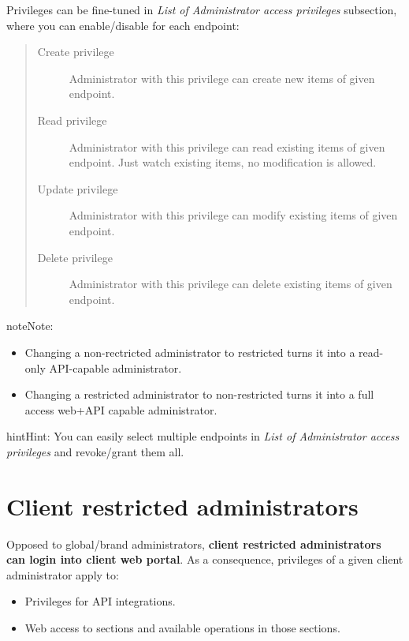\documentclass[letterpaper,10pt,english]{sphinxmanual}
\begin{document}
Privileges can be fine-tuned in \emph{List of Administrator access privileges} subsection, where you can enable/disable
for each endpoint:
\begin{quote}
\begin{description}
\item[{Create privilege}] \leavevmode
Administrator with this privilege can create new items of given endpoint.

\item[{Read privilege}] \leavevmode
Administrator with this privilege can read existing items of given endpoint. Just watch existing items, no
modification is allowed.

\item[{Update privilege}] \leavevmode
Administrator with this privilege can modify existing items of given endpoint.

\item[{Delete privilege}] \leavevmode
Administrator with this privilege can delete existing items of given endpoint.

\end{description}
\end{quote}

\begin{notice}{note}{Note:}\begin{itemize}
\item {} 
Changing a non-rectricted administrator to restricted turns it into a read-only API-capable administrator.

\item {} 
Changing a restricted administrator to non-restricted turns it into a full access web+API capable administrator.

\end{itemize}
\end{notice}

\begin{notice}{hint}{Hint:}
You can easily select multiple endpoints in \emph{List of Administrator access privileges} and revoke/grant them all.
\end{notice}


\section{Client restricted administrators}
\label{api_rest/acls:client-restricted-administrators}
Opposed to global/brand administrators, \textbf{client restricted administrators can login into client web portal}. As a
consequence, privileges of a given client administrator apply to:
\begin{itemize}
\item {} 
Privileges for API integrations.

\item {} 
Web access to sections and available operations in those sections.

\end{itemize}
\end{document}
